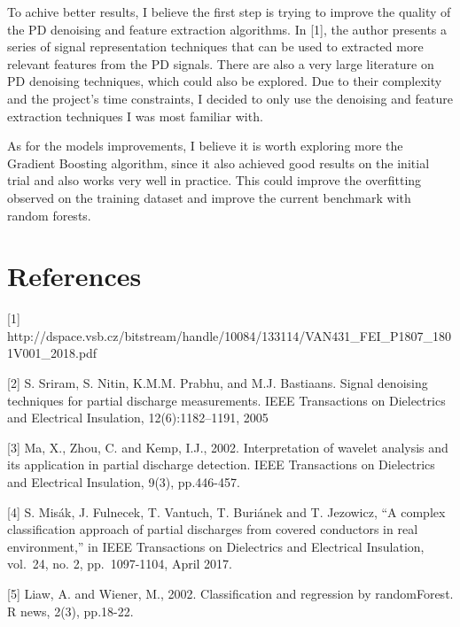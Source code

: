 \documentclass[11pt]{article}
\begin{document}
To achive better results, I believe the first step is trying to improve
the quality of the PD denoising and feature extraction algorithms. In
{[}1{]}, the author presents a series of signal representation
techniques that can be used to extracted more relevant features from the
PD signals. There are also a very large literature on PD denoising
techniques, which could also be explored. Due to their complexity and
the project's time constraints, I decided to only use the denoising and
feature extraction techniques I was most familiar with.

As for the models improvements, I believe it is worth exploring more the
Gradient Boosting algorithm, since it also achieved good results on the
initial trial and also works very well in practice. This could improve
the overfitting observed on the training dataset and improve the current
benchmark with random forests.

    \hypertarget{references}{%
\section{References}\label{references}}

{[}1{]}
http://dspace.vsb.cz/bitstream/handle/10084/133114/VAN431\_FEI\_P1807\_1801V001\_2018.pdf

{[}2{]} S. Sriram, S. Nitin, K.M.M. Prabhu, and M.J. Bastiaans. Signal
denoising techniques for partial discharge measurements. IEEE
Transactions on Dielectrics and Electrical Insulation, 12(6):1182--1191,
2005

{[}3{]} Ma, X., Zhou, C. and Kemp, I.J., 2002. Interpretation of wavelet
analysis and its application in partial discharge detection. IEEE
Transactions on Dielectrics and Electrical Insulation, 9(3), pp.446-457.

{[}4{]} S. Misák, J. Fulnecek, T. Vantuch, T. Buriánek and T. Jezowicz,
``A complex classification approach of partial discharges from covered
conductors in real environment,'' in IEEE Transactions on Dielectrics
and Electrical Insulation, vol.~24, no. 2, pp.~1097-1104, April 2017.

{[}5{]} Liaw, A. and Wiener, M., 2002. Classification and regression by
randomForest. R news, 2(3), pp.18-22.


    
    
    
    
\end{document}
